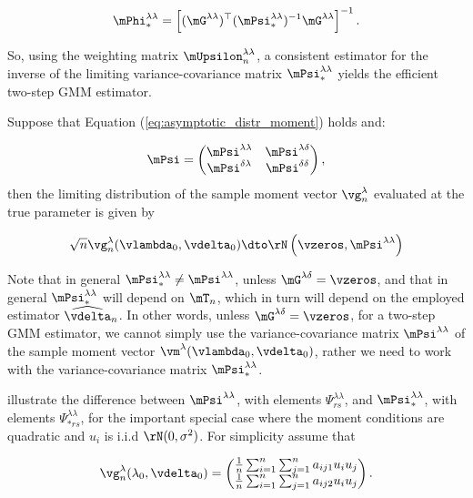 \documentclass[english,12pt]{book}\usepackage[]{graphicx}\usepackage[]{xcolor}
\begin{document}
\begin{equation*}
\mPhi_{*}^{\lambda\lambda} = \left[(\mG^{\lambda\lambda})^\top(\mPsi^{\lambda\lambda}_{*})^{-1}\mG^{\lambda\lambda}\right]^{-1}.
\end{equation*}

So, using the weighting matrix $\mUpsilon_n^{\lambda\lambda}$, a consistent estimator for the inverse of the limiting variance-covariance matrix $\mPsi_{*}^{\lambda\lambda}$ yields the efficient two-step GMM estimator.


Suppose that Equation (\ref{eq:asymptotic_distr_moment}) holds and:

\begin{equation*}
	\mPsi = \begin{pmatrix}
	\mPsi^{\lambda\lambda} & \mPsi^{\lambda\delta} \\
	\mPsi^{\delta\lambda} & \mPsi^{\delta\delta}
	\end{pmatrix},
\end{equation*}
%
then the limiting distribution of the sample moment vector $\vg_n^{\lambda}$ evaluated at the true parameter is given by

\begin{equation*}
\sqrt{n}\vg_{n}^{\lambda}(\vlambda_0, \vdelta_0)\dto \rN\left(\vzeros, \mPsi^{\lambda\lambda}\right)
\end{equation*}

Note that in general $\mPsi_{*}^{\lambda\lambda}\neq \mPsi^{\lambda\lambda}$, unless $\mG^{\lambda\delta} = \vzeros$, and that in general $\mPsi_{*}^{\lambda\lambda}$ will depend on $\mT_n$, which in turn will depend on the employed estimator $\widehat{\vdelta}_n$. In other words, unless $\mG^{\lambda\delta} = \vzeros$, for a two-step GMM estimator, we cannot simply use the variance-covariance matrix $\mPsi^{\lambda\lambda}$ of the sample moment vector $\vm^{\lambda}(\vlambda_0, \vdelta_0)$, rather we need to work with the variance-covariance matrix $\mPsi_{*}^{\lambda\lambda}$.

\cite{pruchaHB} illustrate the difference between $\mPsi^{\lambda\lambda}$, with elements $\Psi_{rs}^{\lambda\lambda}$, and $\mPsi_{*}^{\lambda\lambda}$, with elements $\Psi_{*rs}^{\lambda\lambda}$, for the important special case where the moment conditions are quadratic and $u_i$ is i.i.d $\rN(0, \sigma^2)$. For simplicity assume that

\begin{equation*}
\vg_n^{\lambda}(\lambda_0, \vdelta_0) = \begin{pmatrix}
\frac{1}{n}\sum_{i = 1} ^n\sum_{j = 1} ^na_{ij1}u_iu_j \\
\frac{1}{n}\sum_{i = 1} ^n\sum_{j = 1} ^na_{ij2}u_iu_j
\end{pmatrix}.
\end{equation*}
\end{document}
